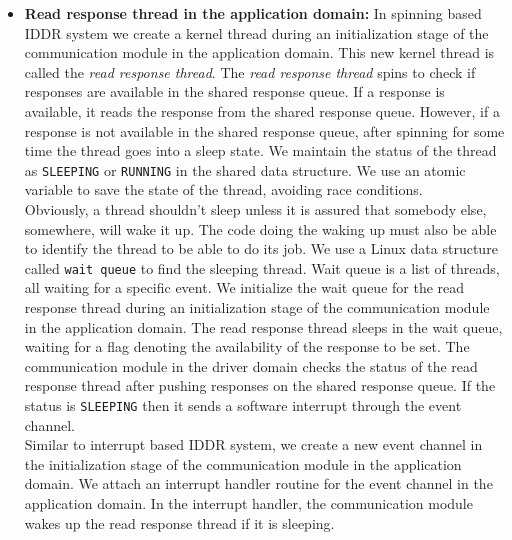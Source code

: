 \begin{itemize}
\item \textbf{Read response thread in the application domain:} 
In spinning based IDDR system we create a kernel thread during an initialization stage of the communication module in the application domain. This new kernel thread is called the \textit{read response thread}. The \textit{read response thread} spins to check if responses are available in the shared response queue. If a response is available, it reads the response from the shared response queue. However, if a response is not available in the shared response queue, after spinning for some time the thread goes into a sleep state. We maintain the status of the thread as \texttt{SLEEPING} or \texttt{RUNNING} in the shared data structure. We use an atomic variable to save the state of the thread, avoiding race conditions. 
\\[3mm]
Obviously, a thread shouldn't sleep unless it is assured that somebody else, somewhere, will wake it up. The code doing the waking up must also be able to identify the thread to be able to do its job. We use a Linux data structure called \texttt{wait queue} to find the sleeping thread. Wait queue is a list of threads, all waiting for a specific event\cite{Galvin, Bovet:2005:ULK:1077084}. We initialize the wait queue for the read response thread during an initialization stage of the communication module in the application domain. The read response thread sleeps in the wait queue, waiting for a flag denoting the availability of the response to be set. The communication module in the driver domain checks the status of the read response thread after pushing responses on the shared response queue. If the status is \texttt{SLEEPING} then it sends a software interrupt through the event channel.
\\[3mm]
Similar to interrupt based IDDR system, we create a new event channel in the initialization stage of the communication module in the application domain. We attach an interrupt handler routine for the event channel in the application domain. In the interrupt handler, the communication module wakes up the read response thread if it is sleeping. 


\end{itemize}
